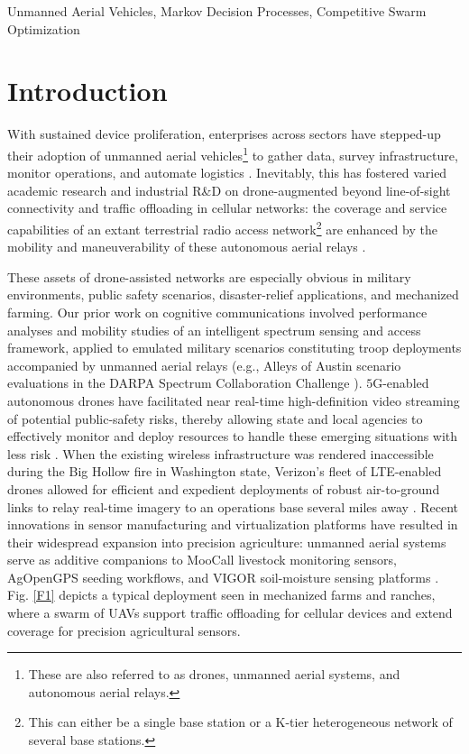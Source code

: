 \documentclass[12pt, draftcls, onecolumn]{IEEEtran}
\theoremstyle{plain}
\theoremstyle{definition}
\theoremstyle{remark}
\begin{document}
\begin{IEEEkeywords}
Unmanned Aerial Vehicles, Markov Decision Processes, Competitive Swarm Optimization
\end{IEEEkeywords}
\vspace{-4mm}


\section{Introduction}\label{S1}
\vspace{-2mm}

With sustained device proliferation, enterprises across sectors have stepped-up their adoption of unmanned aerial vehicles\footnote{These are also referred to as drones, unmanned aerial systems, and autonomous aerial relays.} to gather data, survey infrastructure, monitor operations, and automate logistics \cite{UAVSurvey, UAVTutorial}. Inevitably, this has fostered varied academic research and industrial R\&D on drone-augmented beyond line-of-sight connectivity and traffic offloading in cellular networks: the coverage and service capabilities of an extant terrestrial radio access network\footnote{This can either be a single base station or a K-tier heterogeneous network of several base stations.} are enhanced by the mobility and maneuverability of these autonomous aerial relays \cite{LOSDominance, FundamentalTradeoffs}. 

These assets of drone-assisted networks are especially obvious in military environments, public safety scenarios, disaster-relief applications, and mechanized farming. Our prior work on cognitive communications \cite{TCCN} involved performance analyses and mobility studies of an intelligent spectrum sensing and access framework, applied to emulated military scenarios constituting troop deployments accompanied by unmanned aerial relays (e.g., Alleys of Austin scenario evaluations in the DARPA Spectrum Collaboration Challenge \cite{Alleys-of-Austin}). $5$G-enabled autonomous drones have facilitated near real-time high-definition video streaming of potential public-safety risks, thereby allowing state and local agencies to effectively monitor and deploy resources to handle these emerging situations with less risk \cite{VerizonPublicSafety}. When the existing wireless infrastructure was rendered inaccessible during the Big Hollow fire in Washington state, Verizon's fleet of LTE-enabled drones allowed for efficient and expedient deployments of robust air-to-ground links to relay real-time imagery to an operations base several miles away \cite{VerizonDisasterRelief}. Recent innovations in sensor manufacturing and virtualization platforms have resulted in their widespread expansion into precision agriculture: unmanned aerial systems serve as additive companions to MooCall livestock monitoring sensors, AgOpenGPS seeding workflows, and VIGOR soil-moisture sensing platforms \cite{VerizonAgriculture}. Fig. \ref{F1} depicts a typical deployment seen in mechanized farms and ranches, where a swarm of UAVs support traffic offloading for cellular devices and extend coverage for precision agricultural sensors.
\end{document}
